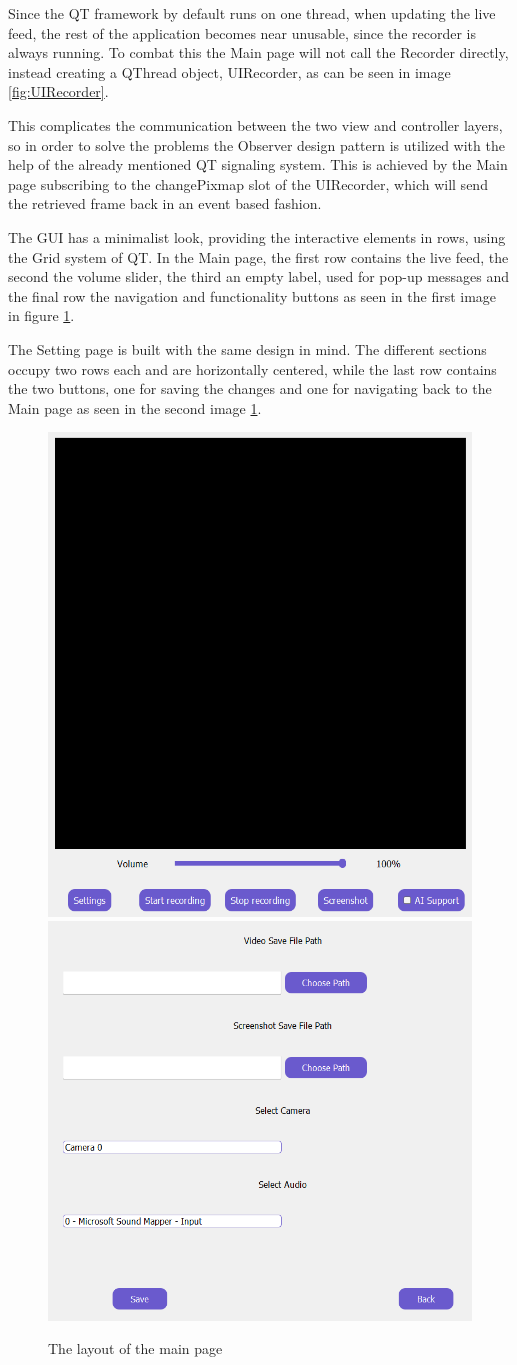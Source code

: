 \par Since the QT framework by default runs on one thread, when updating the live feed, the rest of the application becomes near unusable, since the recorder is always running. To combat this the Main page will not call the Recorder directly, instead creating a QThread object, UIRecorder, as can be seen in image \ref{fig:UIRecorder}.
\par This complicates the communication between the two view and controller layers, so in order to solve the problems the Observer design pattern \cite{observer} is utilized with the help of the already mentioned QT signaling system. This is achieved by the Main page subscribing to the changePixmap slot of the UIRecorder, which will send the retrieved frame back in an event based fashion.
\par The GUI has a minimalist look, providing the interactive elements in rows, using the Grid system of QT. In the Main page, the first row contains the live feed, the second the volume slider, the third an empty label, used for pop-up messages and the final row the navigation and functionality buttons as seen in the first image in figure \ref{fig:PageLooks}.
\par The Setting page is built with the same design in mind. The different sections occupy two rows each and are horizontally centered, while the last row contains the two buttons, one for saving the changes and one for navigating back to the Main page as seen in the second image \ref{fig:PageLooks}.

\begin{figure}
    \centering
    \includegraphics[width=0.35\linewidth]{figures/MainPage.png}
    \includegraphics[width=0.45\linewidth]{figures/SettingsPage.png}
    \caption{The layout of the main page}
    \label{fig:PageLooks}
\end{figure}


